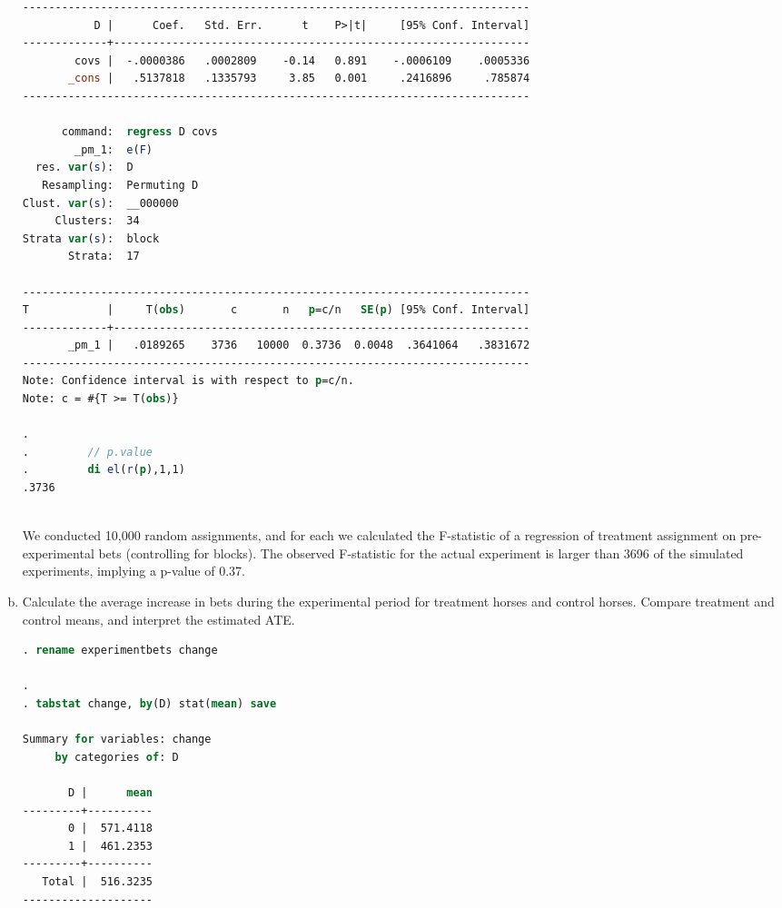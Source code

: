 \documentclass[11pt,notitlepage]{article}\usepackage[]{graphicx}\usepackage[]{color}
\begin{document}
\begin{enumerate}[a)]
\begin{lstlisting}[language=stata]
------------------------------------------------------------------------------
           D |      Coef.   Std. Err.      t    P>|t|     [95% Conf. Interval]
-------------+----------------------------------------------------------------
        covs |  -.0000386   .0002809    -0.14   0.891    -.0006109    .0005336
       _cons |   .5137818   .1335793     3.85   0.001     .2416896     .785874
------------------------------------------------------------------------------

      command:  regress D covs
        _pm_1:  e(F)
  res. var(s):  D
   Resampling:  Permuting D
Clust. var(s):  __000000
     Clusters:  34
Strata var(s):  block
       Strata:  17

------------------------------------------------------------------------------
T            |     T(obs)       c       n   p=c/n   SE(p) [95% Conf. Interval]
-------------+----------------------------------------------------------------
       _pm_1 |   .0189265    3736   10000  0.3736  0.0048  .3641064   .3831672
------------------------------------------------------------------------------
Note: Confidence interval is with respect to p=c/n.
Note: c = #{T >= T(obs)}

. 
.         // p.value
.         di el(r(p),1,1)
.3736



\end{lstlisting}

We conducted 10,000 random assignments, and for each we calculated the F-statistic of a regression of treatment assignment on pre-experimental bets (controlling for blocks).  The observed F-statistic for the actual experiment is larger than 3696 of the simulated experiments, implying a p-value of 0.37.

\item Calculate the average increase in bets during the experimental period for treatment horses and control horses.  Compare treatment and control means, and interpret the estimated ATE.  

\begin{lstlisting}[language=stata]
. rename experimentbets change

. 
. tabstat change, by(D) stat(mean) save   

Summary for variables: change
     by categories of: D 

       D |      mean
---------+----------
       0 |  571.4118
       1 |  461.2353
---------+----------
   Total |  516.3235
--------------------


\end{lstlisting}
\end{enumerate}
\end{document}
